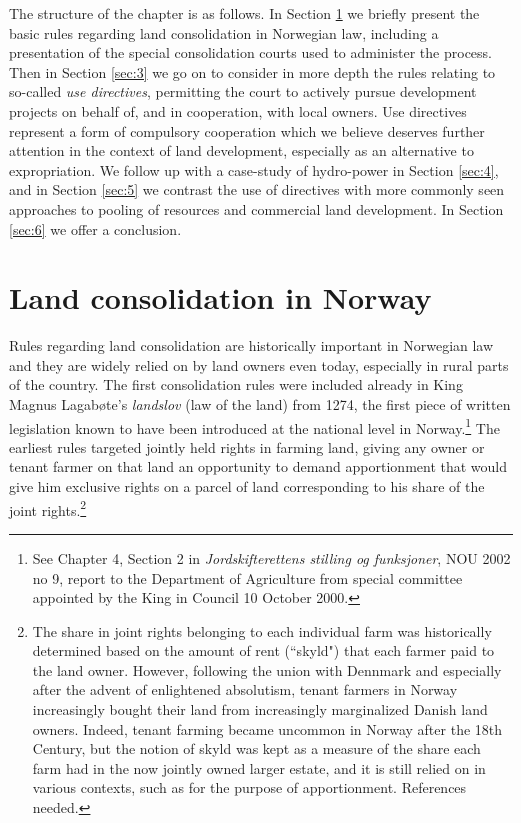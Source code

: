 The structure of the chapter is as follows. In Section \ref{sec:2} we briefly present the basic rules regarding land consolidation in Norwegian law, including a presentation of the special consolidation courts used to administer the process. Then in Section \ref{sec:3} we go on to consider in more depth the rules relating to so-called \emph{use directives}, permitting the court to actively pursue development projects on behalf of, and in cooperation, with local owners. Use directives represent a form of compulsory cooperation which we believe deserves further attention in the context of land development, especially as an alternative to expropriation. We follow up with a case-study of hydro-power in Section \ref{sec:4}, and in Section \ref{sec:5} we contrast the use of directives with more commonly seen approaches to pooling of resources and commercial land development. In Section \ref{sec:6} we offer a conclusion.

\section{Land consolidation in Norway}\label{sec:2}

Rules regarding land consolidation are historically important in Norwegian law and they are widely relied on by land owners even today, especially in rural parts of the country. The first consolidation rules were included already in King Magnus Lagabøte's \emph{landslov} (law of the land) from 1274, the first piece of written legislation known to have been introduced at the national level in Norway.\footnote{See Chapter 4, Section 2 in \emph{Jordskifterettens stilling og funksjoner}, NOU 2002 no 9, report to the Department of Agriculture from special committee appointed by the King in Council 10 October 2000.} The earliest rules targeted jointly held rights in farming land, giving any owner or tenant farmer on that land an opportunity to demand apportionment that would give him exclusive rights on a parcel of land corresponding to his share of the joint rights.\footnote{The share in joint rights belonging to each individual farm was historically determined based on the amount of rent (``skyld") that each farmer paid to the land owner. However, following the union with Dennmark and especially after the advent of enlightened absolutism, tenant farmers in Norway increasingly bought their land from increasingly marginalized Danish land owners. Indeed, tenant farming became uncommon in Norway after the 18th Century, but the notion of skyld was kept as a measure of the share each farm had in the now jointly owned larger estate, and it is still relied on in various contexts, such as for the purpose of apportionment. References needed.}

